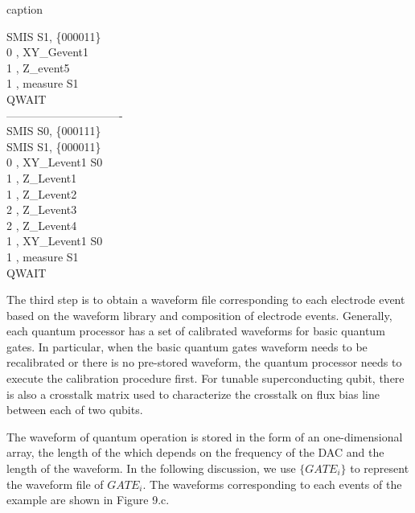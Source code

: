   \begin{algorithm}[ht]
      \caption{caption}
      \begin{ttfamily} 
      \textcolor[RGB]{0,0,205}{SMIS } \quad S1, \{000011\} \\
      0 , \textcolor[RGB]{139,69,19}{XY\_Gevent1}\\    
      1 , \textcolor[RGB]{139,69,19}{Z\_event5}\\
      1 , \textcolor[RGB]{139,69,19}{measure} S1\\
      \textcolor[RGB]{0,0,205}{QWAIT} \\
      \textcolor[RGB]{169,169,169}{-------------------------------}\\
      \textcolor[RGB]{0,0,205}{SMIS } \quad S0, \{000111\} \\
      \textcolor[RGB]{0,0,205}{SMIS } \quad S1, \{000011\} \\
      0 , \textcolor[RGB]{139,69,19}{XY\_Levent1} S0\\
      1 , \textcolor[RGB]{139,69,19}{Z\_Levent1}\\
      1 , \textcolor[RGB]{139,69,19}{Z\_Levent2}\\
      2 , \textcolor[RGB]{139,69,19}{Z\_Levent3}\\
      2 , \textcolor[RGB]{139,69,19}{Z\_Levent4}\\
      1 , \textcolor[RGB]{139,69,19}{XY\_Levent1} S0\\
      1 , \textcolor[RGB]{139,69,19}{measure} S1\\
      \textcolor[RGB]{0,0,205}{QWAIT} 

      \end{ttfamily}
  \end{algorithm} 



The third step is to obtain a waveform file corresponding to each electrode event based on the waveform library and composition of electrode events.
Generally, each quantum processor has a set of calibrated waveforms for basic quantum gates. 
In particular, when the basic quantum gates waveform needs to be recalibrated or there is no pre-stored waveform, the quantum processor needs to execute the calibration procedure first.
For tunable superconducting qubit, there is also a crosstalk matrix used to characterize the crosstalk on flux bias line between each of two qubits. 

The waveform of quantum operation is stored in the form of an one-dimensional array, 
the length of the which depends on the frequency of the DAC and the length of the waveform. 
In the following discussion, we use $\{GATE_i\}$ to represent the waveform file of $GATE_i$. 
The waveforms corresponding to each events of the example are shown in Figure 9.c.


